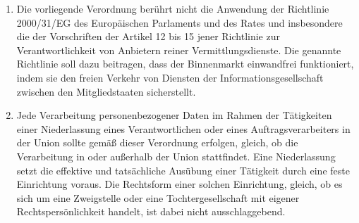 \begin{enumerate}
   \item Die vorliegende Verordnung berührt nicht die Anwendung der Richtlinie 2000/31/EG des Europäischen Parlaments
    und des Rates und insbesondere die der Vorschriften der Artikel 12 bis 15 jener Richtlinie zur
    Verantwortlichkeit von Anbietern reiner Vermittlungsdienste. Die genannte Richtlinie soll dazu beitragen, dass der
    Binnenmarkt einwandfrei funktioniert, indem sie den freien Verkehr von Diensten der Informationsgesellschaft
    zwischen den Mitgliedstaaten sicherstellt.%
   \label{eg:21}
   

   \item Jede Verarbeitung personenbezogener Daten im Rahmen der Tätigkeiten einer Niederlassung eines Verantwortlichen
    oder eines Auftragsverarbeiters in der Union sollte gemäß dieser Verordnung erfolgen, gleich, ob die Verarbeitung
    in oder außerhalb der Union stattfindet. Eine Niederlassung setzt die effektive und tatsächliche Ausübung einer
    Tätigkeit durch eine feste Einrichtung voraus. Die Rechtsform einer solchen Einrichtung, gleich, ob es sich um eine
    Zweigstelle oder eine Tochtergesellschaft mit eigener Rechtspersönlichkeit handelt, ist dabei nicht
    ausschlaggebend.%
   \label{eg:22}
   


\end{enumerate}
